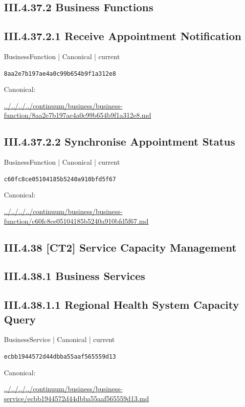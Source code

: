 \documentclass[10pt,a4paper]{article}
\begin{document}
\subsection*{III.4.37.2 Business Functions}
\subsection*{III.4.37.2.1 Receive Appointment Notification}
{\small BusinessFunction | Canonical | current}\par
\texttt{8aa2e7b197ae4a0c99b654b9f1a312e8}\par
Canonical: \par
{\footnotesize\url{../../../../continuum/business/business-function/8aa2e7b197ae4a0c99b654b9f1a312e8.md}}\par
\subsection*{III.4.37.2.2 Synchronise Appointment Status}
{\small BusinessFunction | Canonical | current}\par
\texttt{c60fc8ce05104185b5240a910bfd5f67}\par
Canonical: \par
{\footnotesize\url{../../../../continuum/business/business-function/c60fc8ce05104185b5240a910bfd5f67.md}}\par
\subsection*{III.4.38 [CT2] Service Capacity Management}
\subsection*{III.4.38.1 Business Services}
\subsection*{III.4.38.1.1 Regional Health System Capacity Query}
{\small BusinessService | Canonical | current}\par
\texttt{ecbb1944572d44dbba55aaf565559d13}\par
Canonical: \par
{\footnotesize\url{../../../../continuum/business/business-service/ecbb1944572d44dbba55aaf565559d13.md}}\par
\end{document}
